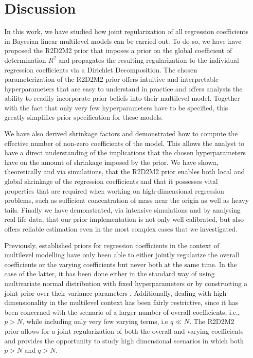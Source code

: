 \section{Discussion}
\label{sec:discussion}

In this work, we have studied how joint regularization of all regression coefficients in Bayesian linear multilevel models can be carried out. To do so, we have have proposed the R2D2M2 prior that imposes a prior on the global coefficient of determination $R^2$ and propagates the resulting regularization to  the individual regression coefficients via a Dirichlet Decomposition. The chosen parameterization of the R2D2M2 prior offers intuitive and interpretable hyperparameters that are easy to understand in practice and offers analysts the ability to readily incorporate prior beliefs into their multilevel model. Together with the fact that only very few hyperparameters have to be specified, this greatly simplifies prior specification for these models.

We have also derived shrinkage factors and demonstrated how to compute the effective number of non-zero coefficients of the model. This allows the analyst to have a direct understanding of the implications that the chosen hyperparameters have on the amount of shrinkage imposed by the prior.  We have shown, theoretically and via simulations, that the R2D2M2 prior enables both local and global shrinkage of the regression coefficients and that it possesses vital properties that are required when working on high-dimensional regression problems, such as sufficient concentration of mass near the origin as well as heavy tails.  Finally we have demonstrated, via intensive simulations and by analysing real life data, that our prior implementation is not only well calibrated, but also offers reliable estimation even in the most complex cases that we investigated.

Previously, established priors for regression coefficients in the context of multilevel modelling have only been able to either jointly regularize the overall coefficients or the varying coefficients but never both at the same time. In the case of the latter, it has been done either in the standard way of using multivariate normal distribution with fixed hyperparameters \citep{gelman_hill_2006} or by constructing a joint prior over their variance parameters \citep{Fulgstad2019}. Additionally, dealing with high dimensionality in the multilevel context has been fairly restrictive, since it has been concerned with the scenario of a larger number of overall coefficients, i.e., $p >N$, while including only very few varying terms, i.e $q \ll N$. The R2D2M2 prior allows for a joint regularization of both the overall and varying coefficients and provides the opportunity to study high dimensional scenarios in which both $p >N$ and $q>N$.

